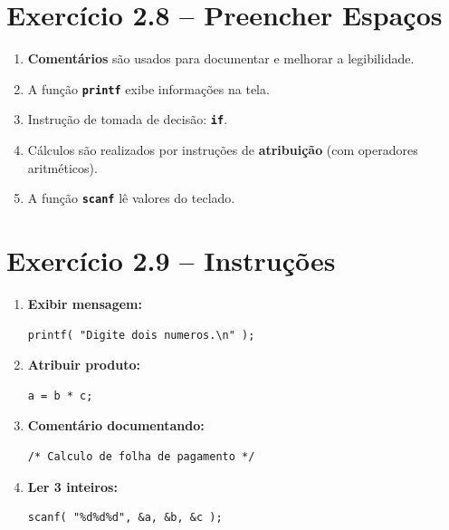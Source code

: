 \documentclass[12pt,a4paper]{article}
\begin{document}
\newpage

\section{Exercício 2.8 -- Preencher Espaços}

\begin{respostabox}
\begin{enumerate}[label=\textbf{\alph*)}]
\item \textbf{Comentários} são usados para documentar e melhorar a legibilidade.
\item A função \textbf{\texttt{printf}} exibe informações na tela.
\item Instrução de tomada de decisão: \textbf{\texttt{if}}.
\item Cálculos são realizados por instruções de \textbf{atribuição} (com operadores aritméticos).
\item A função \textbf{\texttt{scanf}} lê valores do teclado.
\end{enumerate}
\end{respostabox}

\section{Exercício 2.9 -- Instruções}

\begin{respostabox}
\begin{enumerate}[label=\textbf{\alph*)}]

\item \textbf{Exibir mensagem:}
\begin{lstlisting}
printf( "Digite dois numeros.\n" );
\end{lstlisting}

\item \textbf{Atribuir produto:}
\begin{lstlisting}
a = b * c;
\end{lstlisting}

\item \textbf{Comentário documentando:}
\begin{lstlisting}
/* Calculo de folha de pagamento */
\end{lstlisting}

\item \textbf{Ler 3 inteiros:}
\begin{lstlisting}
scanf( "%d%d%d", &a, &b, &c );
\end{lstlisting}
\end{enumerate}
\end{respostabox}
\end{document}
